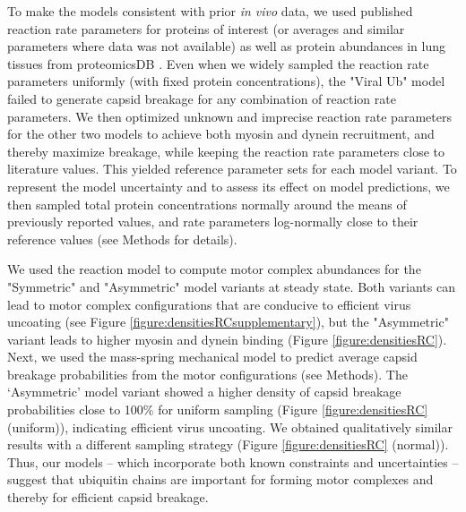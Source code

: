 To make the models consistent with prior \textit{in vivo} data, we used published reaction rate parameters for proteins of interest (or averages and similar parameters where data was not available) as well as protein abundances in lung tissues from proteomicsDB \cite{schmidt2018proteomicsdb}. Even when we widely sampled the reaction rate parameters uniformly (with fixed protein concentrations), the "Viral Ub" model failed to generate capsid breakage for any combination of reaction rate parameters. We then optimized unknown and imprecise reaction rate parameters for the other two models to achieve both myosin and dynein recruitment, and thereby maximize breakage, while keeping the reaction rate parameters close to literature values. This yielded reference parameter sets for each model variant. To represent the model uncertainty and to assess its effect on model predictions, we then sampled total protein concentrations normally around the means of previously reported values, and rate parameters log-normally close to their reference values (see Methods for details).

We used the reaction model to compute motor complex abundances for the "Symmetric" and "Asymmetric" model variants at steady state. Both variants can lead to motor complex configurations that are conducive to efficient virus uncoating (see Figure \ref{figure:densitiesRCsupplementary}), but the "Asymmetric" variant leads to higher myosin and dynein binding (Figure \ref{figure:densitiesRC}). Next, we used the mass-spring mechanical model to predict average capsid breakage probabilities from the motor configurations (see Methods). The ‘Asymmetric’ model variant showed a higher density of capsid breakage probabilities close to 100\% for uniform sampling (Figure \ref{figure:densitiesRC} (uniform)), indicating efficient virus uncoating. We obtained qualitatively similar results with a different sampling strategy (Figure \ref{figure:densitiesRC} (normal)). Thus, our models – which incorporate both known constraints and uncertainties – suggest that ubiquitin chains are important for forming motor complexes and thereby for efficient capsid breakage.

